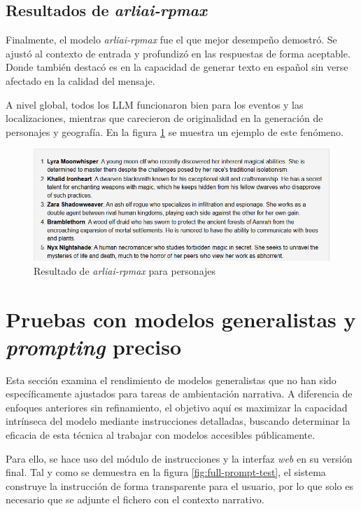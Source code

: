 \subsection{Resultados de \textit{arliai-rpmax}}
Finalmente, el modelo \textit{arliai-rpmax} fue el que mejor desempeño demostró. 
Se ajustó al contexto de entrada y profundizó en las respuestas de forma aceptable.
Donde también destacó es en la capacidad de generar texto en español sin verse afectado
en la calidad del mensaje. 

A nivel global, todos los LLM funcionaron bien para los eventos y las localizaciones,
mientras que carecieron de originalidad en la generación de personajes y geografía.
En la figura \ref{fig:rpmax-chars} se muestra un ejemplo de este fenómeno.

\begin{figure}[htbp]
	\centering
	\includegraphics[width=1\textwidth]{./Figures/rpmax-noprompt-chars.png}
	\caption{Resultado de \textit{arliai-rpmax} para personajes}
	\label{fig:rpmax-chars}
\end{figure}

\section{Pruebas con modelos generalistas y \textit{prompting} preciso}
Esta sección examina el rendimiento de modelos generalistas que no han sido específicamente
ajustados para tareas de ambientación narrativa.
A diferencia de enfoques anteriores sin refinamiento,
el objetivo aquí es maximizar la capacidad intrínseca del modelo mediante instrucciones detalladas,
buscando determinar la eficacia de esta técnica al trabajar con modelos accesibles públicamente.

Para ello, se hace uso del módulo de instrucciones y la interfaz \textit{web}
en su versión final. Tal y como se demuestra en la figura \ref{fig:full-prompt-test},
el sistema construye la instrucción de forma transparente para el usuario, por lo que
solo es necesario que se adjunte el fichero con el contexto narrativo.

